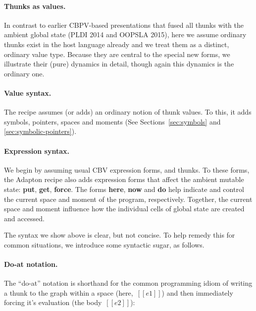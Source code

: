 \documentclass[11pt]{article}
\begin{document}
\paragraph{Thunks as values.}
In contrast to earlier CBPV-based presentations that fused all thunks
with the ambient global state (PLDI 2014 and OOPSLA 2015), here we
assume ordinary thunks exist in the host language already and we treat
them as a distinct, ordinary value type.
%
Because they are central to the special new forms, we illustrate their
(pure) dynamics in detail, though again this dynamics is the ordinary one.

\paragraph{Value syntax.}
The recipe assumes (or adds) an ordinary notion of thunk values.
%
To this, it adds symbols, pointers, spaces and moments (See Sections~\ref{sec:symbols} and \ref{sec:symbolic-pointers}).

\ottgrammartabular{
  \ottv
}

\paragraph{Expression syntax.}

We begin by assuming usual CBV expression forms, and thunks.
%
To these forms, the Adapton recipe also adds expression forms that
affect the ambient mutable state: \textbf{put}, \textbf{get}, \textbf{force}.
%
The forms \textbf{here}, \textbf{now} and \textbf{do} help indicate
and control the current space and moment of the program, respectively.
%
Together, the current space and moment influence how the individual
cells of global state are created and accessed.

\ottgrammartabular{
  \otte
}

\ottgrammartabular{
  \ottC
  \\
  \ottCxtVerb
  \\
  \ottCxtDim
}

\noindent
The syntax we show above is clear, but not concise.
%
To help remedy this for common situations, we introduce some syntactic sugar, as follows.

\paragraph{Do-at notation.}

The ``do-at'' notation is shorthand for the common programming idiom
of writing a thunk to the graph within a space (here,~$[[e1]]$) and then
immediately forcing it's evaluation (the body~$[[e2]]$):
\end{document}
